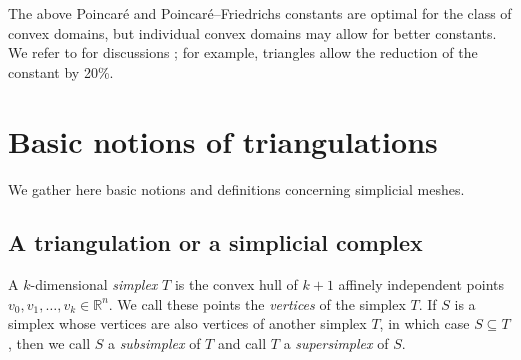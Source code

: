\documentclass[10pt,letterpaper]{article}
\newcommand\cye[1]{%
  \protect\leavevmode
  \begingroup
    \color{red!35!yellow}%
    #1%
  \endgroup
}
\newcommand{\notice}[1]{\textcolor{red}{REMARK: #1}}
\begin{document}
\begin{remark}
\end{remark}


\begin{remark}
    \cye{The above} Poincar\'e and Poincar\'e--Friedrichs constants are optimal for the class of convex domains, 
    but individual convex domains may allow for better constants.
    We refer to \cite{Liu_Kik_interp_10, Cars_Ged_Rim_expl_cnst_12, matculevich2016explicit} for \cye{discussions};
    for example, triangles allow the reduction of the constant by 20\%.
\end{remark}















\section{Basic notions of triangulations}\label{section:triangulations}

We gather \cye{here} basic notions and definitions concerning simplicial meshes. 

\subsection{\cye{A triangulation or a simplicial complex}}
  
A ${k}$-dimensional \emph{simplex} $T$ is the convex hull of ${k}+1$ affinely independent points $v_0, v_1, \ldots, v_{{k}} \in \mathbb{R}^{n}$. We call these points the \emph{vertices} of the simplex $T$. 
If $S$ is a simplex whose vertices are also vertices of another simplex $T$, in which case $S \subseteq T$, 
then we call $S$ a \textit{subsimplex} of $T$ and call $T$ a \textit{supersimplex} of $S$. 
\end{document}

